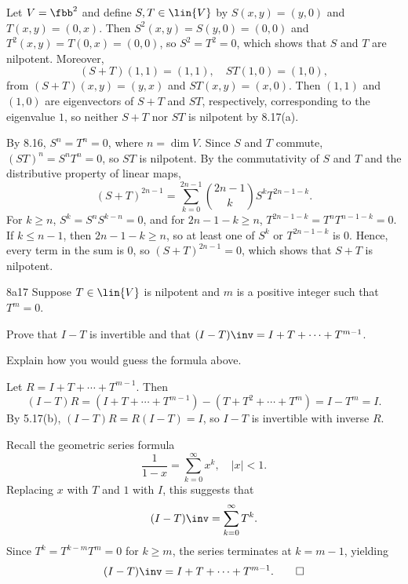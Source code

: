 \begin{solenum}
    \item Let $V = \fbb^2$ and define $S, T \in \lin{V}$ by $S(x, y) = (y, 0)$ and $T(x, y) = (0, x)$.
    Then $S^2(x, y) = S(y, 0) = (0, 0)$ and $T^2(x, y) = T(0, x) = (0, 0)$, so $S^2 = T^2 = 0$, which shows that $S$ and $T$ are nilpotent.
    Moreover,
    \[
        (S + T)(1, 1) = (1, 1), \quad ST(1, 0) = (1, 0),
    \]
    from $(S + T)(x, y) = (y, x)$ and $ST(x, y) = (x, 0)$.
    Then $(1, 1)$ and $(1, 0)$ are eigenvectors of $S + T$ and $ST$, respectively, corresponding to the eigenvalue $1$, so neither $S + T$ nor $ST$ is nilpotent by 8.17(a).
    \item By 8.16, $S^n = T^n = 0$, where $n = \dim V$.
    Since $S$ and $T$ commute, $(ST)^n = S^n T^n = 0$, so $ST$ is nilpotent.
    By the commutativity of $S$ and $T$ and the distributive property of linear maps,
    \[
        (S + T)^{2n-1} = \sum_{k=0}^{2n-1} \binom{2n-1}{k} S^k T^{2n-1-k}.
    \]
    For $k \geq n$, $S^k = S^n S^{k-n} = 0$, and for $2n-1-k \geq n$, $T^{2n-1-k} = T^n T^{n-1-k} = 0$.
    If $k \leq n-1$, then $2n-1-k \geq n$, so at least one of $S^k$ or $T^{2n-1-k}$ is $0$.
    Hence, every term in the sum is $0$, so $(S + T)^{2n-1} = 0$, which shows that $S + T$ is nilpotent.
\end{solenum}

\begin{exercise}{8a17}
    Suppose $T \in \lin{V}$ is nilpotent and $m$ is a positive integer such that $T^m = 0$.
    \begin{subexercises}
        \item Prove that $I - T$ is invertible and that $(I - T)\inv = I + T + \cdots + T^{m-1}$.
        \item Explain how you would guess the formula above.
    \end{subexercises}
\end{exercise}

\begin{solenum}
    \item Let $R = I + T + \cdots + T^{m-1}$.
    Then
    \[
        (I - T)R = (I + T + \cdots + T^{m-1}) - (T + T^2 + \cdots + T^m) = I - T^m = I.
    \]
    By 5.17(b), $(I - T)R = R(I - T) = I$, so $I - T$ is invertible with inverse $R$.
    \item Recall the geometric series formula
    \[
        \frac{1}{1 - x} = \sum_{k=0}^{\infty} x^k, \quad |x| < 1.
    \]
    Replacing $x$ with $T$ and $1$ with $I$, this suggests that
    \[
        (I - T)\inv = \sum_{k=0}^{\infty} T^k.
    \]
    Since $T^k = T^{k-m}T^m = 0$ for $k \geq m$, the series terminates at $k = m-1$, yielding
    \[
        (I - T)\inv = I + T + \cdots + T^{m-1}. \qedhere
    \]
\end{solenum}

